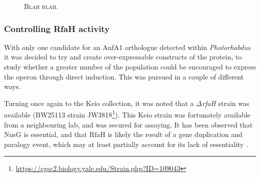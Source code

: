\begin{figure}[p]
  \begin{subfigure}{0.24\textwidth}
  \captionsetup{singlelinecheck=off, justification=centering, font=footnotesize, aboveskip=5pt}
  \caption{}
  \end{subfigure}
  \begin{subfigure}{0.24\textwidth}
  \captionsetup{singlelinecheck=off, justification=centering, font=footnotesize, aboveskip=5pt}
  \caption{}
  \end{subfigure}
  \begin{subfigure}{0.24\textwidth}
  \captionsetup{singlelinecheck=off, justification=centering, font=footnotesize, aboveskip=5pt}
  \caption{}
  \end{subfigure}
  \begin{subfigure}{0.24\textwidth}
  \captionsetup{singlelinecheck=off, justification=centering, font=footnotesize, aboveskip=5pt}
  \caption{}
  \end{subfigure}
  
  
\captionsetup{singlelinecheck=off, justification=justified, font=footnotesize, aboveskip=10pt}
\caption[RNA structures for JUMPstart locations in PVCs/Afp]{\textsc{\normalsize Blah blah.}}
\label{jumpstarts}
\end{figure}

\subsubsection{Controlling RfaH activity}
With only one candidate for an AnfA1 orthologue detected within \emph{Photorhabdus} it was decided to try and create over-expressable constructs of the protein, to study whether a greater number of the population could be encouraged to express the operon through direct induction. This was pursued in a couple of different ways.


Turning once again to the Keio collection, it was noted that a $\Delta$\emph{rfaH} strain was available (BW25113 strain JW3818\footnote{\url{https://cgsc2.biology.yale.edu/Strain.php?ID=109043}})\citep{Baba2006}. This Keio strain was fortunately available from a neighbouring lab, and was secured for assaying. It has been observed that NusG is essential, and that RfaH is likely the result of a gene duplication and paralogy event, which may at least partially account for its lack of essentiality \citep{Belogurov2007}.


